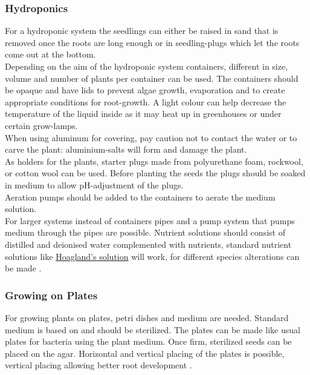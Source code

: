 \subsubsection{Hydroponics}
For a hydroponic system the seedlings can either be raised in sand that is removed once the roots are long enough or in seedling-plugs which let the roots come out at the bottom. \\
Depending on the aim of the hydroponic system containers, different in size, volume and number of plants per container can be used. The containers should be opaque and have lids to prevent algae growth, evaporation and to create appropriate conditions for root-growth. A light colour can help decrease the temperature of the liquid inside as it may heat up in greenhouses or under certain grow-lamps. \\
When using aluminum for covering, pay caution not to contact the water or to carve the plant: aluminium-salts will form and damage the plant. \\
As holders for the plants, starter plugs made from polyurethane foam, rockwool, or cotton wool can be used. Before planting the seeds the plugs should be soaked in medium to allow pH-adjustment of the plugs.\\
Aeration pumps should be added to the containers to aerate the medium solution. \\
For larger systems instead of containers pipes and a pump system that pumps medium through the pipes are possible. 
Nutrient solutions should consist of distilled and deionised water complemented with nutrients, standard nutrient solutions like \href{http://pmb.berkeley.edu/newpmb/faculty/arnon/Hoagland_Arnon_Solution.pdf}{Hoagland's solution} will work, for different species alterations can be made \parencite{Podar2012}.

\subsubsection{Growing on Plates}
For growing plants on plates, petri dishes and medium are needed. Standard medium is based on  \parencite{Murashige1962} and should be sterilized. The plates can be made like usual plates for bacteria using the plant medium. Once firm, sterilized seeds can be placed on the agar. Horizontal and vertical placing of the plates is possible, vertical placing allowing better root development \parencite{Podar2012}. 

